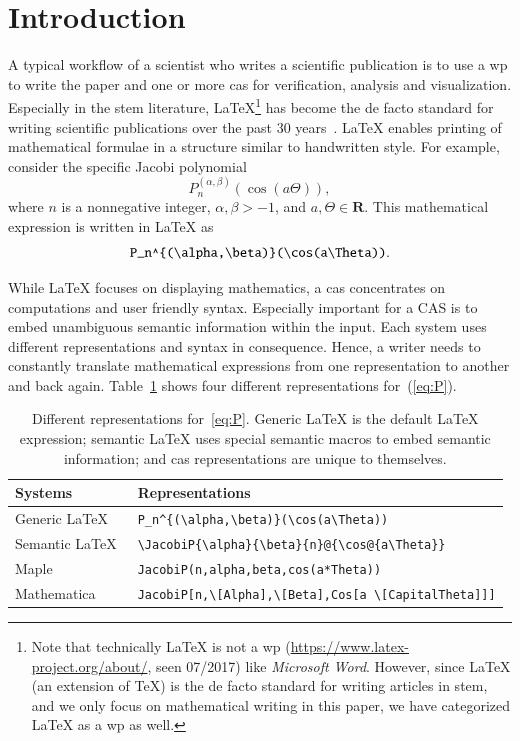 \documentclass[a4paper,11pt]{article}
\newcommand{\Maple}{Maple}
\newcommand{\Mathematica}{Mathematica}
\theoremstyle{defTheoStyle}
\theoremstyle{defExampStyle}
\begin{document}
\section{Introduction}
A typical workflow of a scientist who writes a scientific publication is to use a \gls*{wp} to write the paper and one or more \gls*{cas} for verification, analysis and visualization. Especially in the \gls*{stem} literature, \LaTeX\footnote{Note that technically \LaTeX{} is not a \gls*{wp} (\url{https://www.latex-project.org/about/}, seen 07/2017) like \textit{Microsoft Word}. However, since \LaTeX{} (an extension of \TeX) is the de facto standard for writing articles in \gls*{stem}, and we only focus on mathematical writing in this paper, we have categorized \LaTeX{} as a \gls*{wp} as well.} has become the de facto standard for writing scientific publications over the past 30 years~\parencites{Knuth}[559]{DigitalTypo}{LATEX:Standard}. \LaTeX{} enables printing of mathematical formulae in a structure similar to handwritten style. For example, consider the specific Jacobi polynomial~\parencite[Table 18.3.1]{NIST:DLMF}
\begin{equation}\label{eq:P}
P_n^{(\alpha , \beta)}(\cos(a\Theta)),
\end{equation}
where $n$ is a nonnegative integer, $\alpha, \beta > -1$, and $a,\Theta\in{\mathbf R}$.
This mathematical expression is written in \LaTeX{} as
\begin{equation*}
\verb|P_n^{(\alpha,\beta)}(\cos(a\Theta))|.
\end{equation*}

While \LaTeX{} focuses on displaying mathematics, a \gls*{cas} concentrates on computations and user friendly syntax. Especially important for a CAS is to embed unambiguous semantic information within the input. Each system uses different representations and syntax in consequence. Hence, a writer needs to constantly translate mathematical expressions from one representation to another and back again. Table~\ref{tab:JacobiP-usecase} shows four different representations for~(\ref{eq:P}).

\begin{table}[ht]
	\centering
	\begin{tabular}{ll}
		\hline
		Systems & Representations \\
		\hline
		\hline
		Generic \LaTeX\ & \verb|P_n^{(\alpha,\beta)}(\cos(a\Theta))| \\ 
		Semantic \LaTeX\ & \verb|\JacobiP{\alpha}{\beta}{n}@{\cos@{a\Theta}}| \\
		\Maple & \verb|JacobiP(n,alpha,beta,cos(a*Theta))| \\ 
		\Mathematica & \verb|JacobiP[n,\[Alpha],\[Beta],Cos[a \[CapitalTheta]]]|\\
		\hline
	\end{tabular}
	\caption{Different representations for~\eqref{eq:P}. Generic \LaTeX{} is the default \LaTeX{} expression; semantic \LaTeX{} uses special semantic macros to embed semantic information; and \gls*{cas} representations are unique to themselves.}
	\label{tab:JacobiP-usecase}
\end{table}
\end{document}
